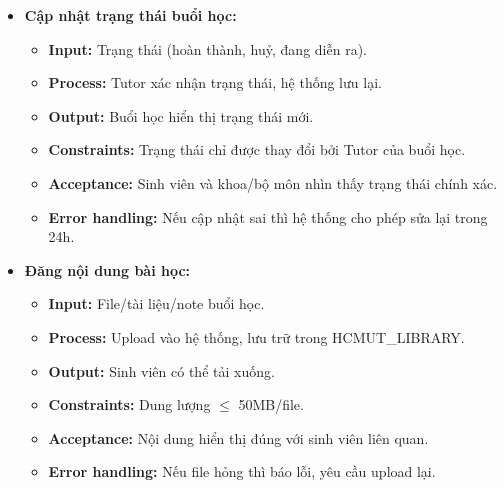 \begin{itemize}
    \item \textbf{Cập nhật trạng thái buổi học:}
    \begin{itemize}
        \item \textbf{Input:} Trạng thái (hoàn thành, huỷ, đang diễn ra).
        \item \textbf{Process:} Tutor xác nhận trạng thái, hệ thống lưu lại.
        \item \textbf{Output:} Buổi học hiển thị trạng thái mới.
        \item \textbf{Constraints:} Trạng thái chỉ được thay đổi bởi Tutor của buổi học.
        \item \textbf{Acceptance:} Sinh viên và khoa/bộ môn nhìn thấy trạng thái chính xác.
        \item \textbf{Error handling:} Nếu cập nhật sai thì hệ thống cho phép sửa lại trong 24h.
    \end{itemize}

    \item \textbf{Đăng nội dung bài học:}
    \begin{itemize}
        \item \textbf{Input:} File/tài liệu/note buổi học.
        \item \textbf{Process:} Upload vào hệ thống, lưu trữ trong HCMUT\_LIBRARY.
        \item \textbf{Output:} Sinh viên có thể tải xuống.
        \item \textbf{Constraints:} Dung lượng $\leq$ 50MB/file.
        \item \textbf{Acceptance:} Nội dung hiển thị đúng với sinh viên liên quan.
        \item \textbf{Error handling:} Nếu file hỏng thì báo lỗi, yêu cầu upload lại.
    \end{itemize}
\end{itemize}



